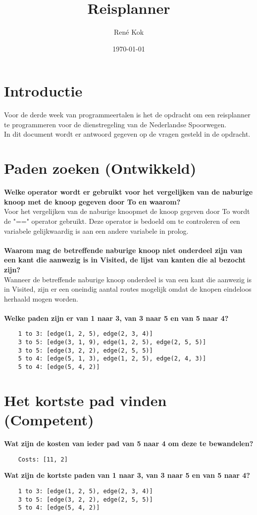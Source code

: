 \documentclass{uva-inf-article}
\title{Reisplanner}
\author{René Kok}
\date{\today}
\begin{document}
\maketitle

\section{Introductie}
Voor de derde week van programmeertalen is het de opdracht om een reisplanner te programmeren 
voor de dienstregeling van de Nederlandse Spoorwegen.\\
In dit document wordt er antwoord gegeven op de vragen gesteld in de opdracht.

\section{Paden zoeken (Ontwikkeld)}
\textbf{Welke operator wordt er gebruikt voor het vergelijken van de naburige knoop met de knoop gegeven door To en waarom?}\\
Voor het vergelijken van de naburige knoopmet de knoop gegeven door To wordt de "==" operator gebruikt. 
Deze operator is bedoeld om te controleren of een variabele gelijkwaardig is aan een andere variabele in prolog.\\\\  
\textbf{Waarom mag de betreffende naburige knoop niet onderdeel zijn van een kant die aanwezig is in Visited, de lijst van kanten die al bezocht zijn?}\\
Wanneer de betreffende naburige knoop onderdeel is van een kant die aanwezig is in Visited, 
zijn er een oneindig aantal routes mogelijk omdat de knopen eindeloos herhaald mogen worden.\\\\
\textbf{Welke paden zijn er van 1 naar 3, van 3 naar 5 en van 5 naar 4?}

\begin{lstlisting}
    1 to 3: [edge(1, 2, 5), edge(2, 3, 4)]
    3 to 5: [edge(3, 1, 9), edge(1, 2, 5), edge(2, 5, 5)]
    3 to 5: [edge(3, 2, 2), edge(2, 5, 5)]
    5 to 4: [edge(5, 1, 3), edge(1, 2, 5), edge(2, 4, 3)]
    5 to 4: [edge(5, 4, 2)]
\end{lstlisting}

\newpage
\section{Het kortste pad vinden (Competent)}
\textbf{Wat zijn de kosten van ieder pad van 5 naar 4 om deze te bewandelen?}
\begin{lstlisting}
    Costs: [11, 2]
\end{lstlisting}
\textbf{Wat zijn de kortste paden van 1 naar 3, van 3 naar 5 en van 5 naar 4?}
\begin{lstlisting}
    1 to 3: [edge(1, 2, 5), edge(2, 3, 4)]
    3 to 5: [edge(3, 2, 2), edge(2, 5, 5)]
    5 to 4: [edge(5, 4, 2)]
\end{lstlisting}
\end{document}
